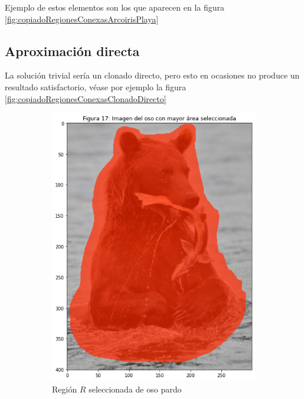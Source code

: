 \documentclass[11pt,twoside,titlepage,a4paper]{article}
\numberwithin{equation}{section} %
\theoremstyle{usual}
\begin{document}
Ejemplo de estos elementos son los que aparecen en la figura \ref{fig:copiadoRegionesConexasArcoirisPlaya}

\subsection{Aproximación directa}  

La solución trivial sería un clonado directo, pero esto en ocasiones no produce un resultado satisfactorio, véase por ejemplo la figura \ref{fig:copiadoRegionesConexasClonadoDirecto}

\begin{figure}[h]
    \centering
    \begin{subfigure}[t]{0.18\textwidth}
        \includegraphics[width=\textwidth]{imagenes/PoissonImageEditing_cell_23_output_5.png}
        \caption{Región $R$ seleccionada de oso pardo}
    \end{subfigure}
    \begin{subfigure}[t]{0.36\textwidth}

\end{subfigure}
\end{figure}
\end{document}
